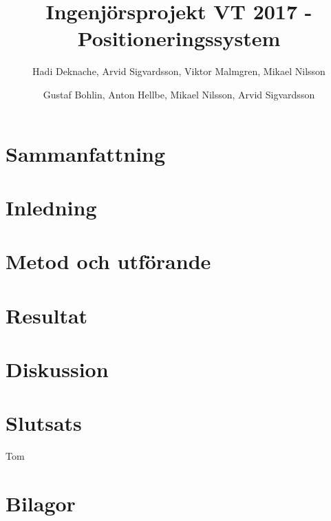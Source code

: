 \documentclass{article}
\title{Ingenjörsprojekt VT 2017 - Positioneringssystem}
\author{Hadi Deknache, Arvid Sigvardsson,
Viktor Malmgren, Mikael Nilsson}
\author{Gustaf Bohlin, Anton Hellbe, Mikael Nilsson, Arvid Sigvardsson}
\begin{document}
\begin{titlepage}
\maketitle

\centering  
\thispagestyle{empty}
\clearpage
\end{titlepage}

\section{Sammanfattning} 

\newpage
\tableofcontents
\thispagestyle{empty}
\clearpage

\section{Inledning}

\section{Metod och utförande}

\section{Resultat}

\section{Diskussion}

\section{Slutsats}






\newpage
\begin{thebibliography}{99}

 Tom

\end{thebibliography}

\section{Bilagor}
\end{document}
